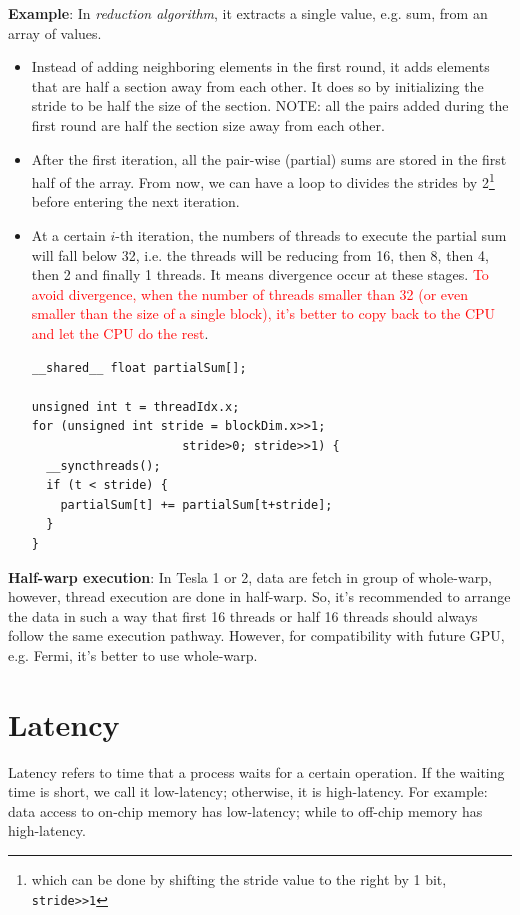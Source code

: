 {\bf Example}: In {\it reduction algorithm}, it extracts a single
value, e.g. sum, from an array of values.
\begin{itemize}
\item Instead of adding neighboring elements in the first round, it
  adds elements that are half a section away from each other. It does
  so by initializing the stride to be half the size of the
  section. NOTE: all the pairs added during the first round are half
  the section size away from each other. 
\item After the first iteration, all the pair-wise (partial) sums are
  stored in the first half of the array. From now, we can have a loop
  to divides the strides by
  2\footnote{which can be done by shifting the stride value to the
    right by 1 bit, \lstinline!stride>>1!}
  before entering the next iteration.
\item At a certain $i$-th iteration, the numbers of threads to execute
  the partial sum will fall below 32, i.e. the threads will be
  reducing from 16, then 8, then 4, then 2 and finally 1 threads. It
  means divergence occur at these stages.
  \textcolor{red}{To avoid divergence, when the number of threads
    smaller than 32 (or even smaller than the size of a single block),
    it's better to copy back to the CPU and let the CPU do the rest}.
\begin{lstlisting}
__shared__ float partialSum[];

unsigned int t = threadIdx.x;
for (unsigned int stride = blockDim.x>>1; 
                     stride>0; stride>>1) {
  __syncthreads();
  if (t < stride) {
    partialSum[t] += partialSum[t+stride];
  }
}
\end{lstlisting}
\end{itemize}

{\bf Half-warp execution}: In Tesla 1 or 2, data are fetch in group of
whole-warp, however, thread execution are done in half-warp. So, it's
recommended to arrange the data in such a way that first 16 threads or
half 16 threads should always follow the same execution
pathway. However, for compatibility with future GPU, e.g. Fermi, it's
better to use whole-warp.

\section{Latency}
\label{sec:latency}

Latency refers to time that a process waits for a certain
operation. If the waiting time is short, we call it low-latency;
otherwise, it is high-latency. For example: data access to on-chip
memory has low-latency; while to off-chip memory has high-latency. 


